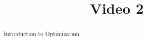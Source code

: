 \documentclass[handout]{ximera}
\title{Video 2}
\begin{document}
\begin{abstract}
Introduction to Optimization
\end{abstract}

\maketitle

\end{document}
